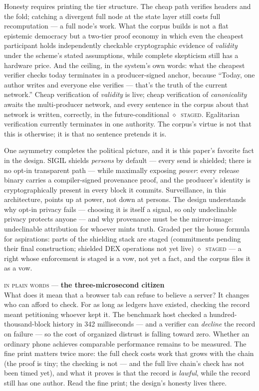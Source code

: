 \documentclass[10pt,a4paper]{article}
\newcommand{\stG}{\textcolor{sigilviolet}{$\diamond$}~{\scriptsize\textcolor{sigilviolet}{\textsc{staged}}}}
\newcommand{\layman}[3]{%
\begin{tcolorbox}[enhanced,
  interior style={left color=#1!9,right color=white},
  colframe=#1!45!slate,boxrule=0.5pt,arc=3pt,
  borderline west={2.5pt}{0pt}{#1},
  left=9pt,right=9pt,top=7pt,bottom=7pt]
{\scriptsize\textcolor{#1}{\textsc{in plain words}}\; — \;\textbf{\small #2}}\\[3pt]
\small #3
\end{tcolorbox}}
\begin{document}
Honesty requires printing the tier structure. The cheap path verifies headers and
the fold; catching a divergent full node at the state layer still costs full
recomputation — a full node's work. What the corpus builds is not a flat epistemic
democracy but a two-tier proof economy in which even the cheapest participant
holds independently checkable cryptographic evidence of \emph{validity} under the
scheme's stated assumptions, while complete skepticism
still has a hardware price. And the ceiling, in the system's own words: what the
cheapest verifier checks today terminates in a producer-signed anchor, because
``Today, one author writes and everyone else verifies — that's the truth of the
current network.'' Cheap verification of \emph{validity} is live; cheap
verification of \emph{canonicality} awaits the multi-producer network, and every
sentence in the corpus about that network is written, correctly, in the
future-conditional \stG. Egalitarian verification currently terminates in one
authority. The corpus's virtue is not that this is otherwise; it is that no
sentence pretends it is.

One asymmetry completes the political picture, and it is this paper's favorite
fact in the design. SIGIL shields \emph{persons} by default — every send is
shielded; there is no opt-in transparent path — while maximally exposing
\emph{power}: every release binary carries a compiler-signed provenance proof, and
the producer's identity is cryptographically present in every block it commits.
Surveillance, in this architecture, points up at power, not down at persons. The
design understands why opt-in privacy fails — choosing it is itself a signal, so
only undeclinable privacy protects anyone — and why provenance must be the
mirror-image: undeclinable attribution for whoever mints truth. Graded per the
house formula for aspirations: parts of the shielding stack are staged
(commitments pending their final construction; shielded DEX operations not yet
live) \stG{} — a right whose enforcement is staged is a vow, not yet a fact, and
the corpus files it as a vow.

\layman{sigilcyan}{the three-microsecond citizen}{What does it mean that a browser
tab can refuse to believe a server? It changes who can afford to check. For as long
as ledgers have existed, checking the record meant petitioning whoever kept it.
The benchmark host checked a hundred-thousand-block history in 342 milliseconds —
and a verifier can \emph{decline} the record on failure — so the cost of organized
distrust is falling toward zero. Whether an ordinary phone achieves comparable
performance remains to be measured. The fine print matters twice more: the full
check costs work that grows with the chain (the proof is tiny; the checking is
not — and the full live chain's check has not been timed yet), and what it proves
is that the record is \emph{lawful}, while the record still has one author. Read
the fine print; the design's honesty lives there.}
\end{document}

